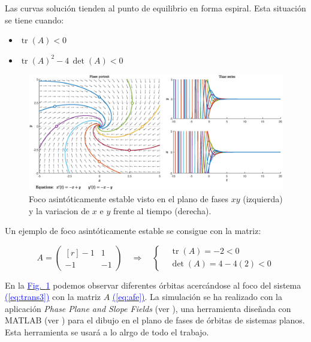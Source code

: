 \documentclass[12pt,a4paper]{report} %
\newcommand{\fref}[1]{\hyperref[#1]{\textcolor{blue}{Fig.~\ref*{#1}}}}
\newcommand{\eref}[1]{\hyperref[#1]{\textcolor{blue}{(\ref*{#1})}}}
\newcommand{\tr}{\operatorname{\textrm{tr}}}
\begin{document}
	\vspace{0.3cm}\noindent Las curvas solución tienden al punto de equilibrio en forma espiral. Esta situación se tiene cuando:
	\begin{itemize}
		\item $\tr(A)<0$
		\item $\tr(A)^2-4\, \det(A)<0$
	\end{itemize}
	
	\begin{figure}[h]
		\centering
		\includegraphics[width=1\textwidth]{estable.eps}
		\caption{Foco asintóticamente estable visto en el plano de fases $xy$ (izquierda) y la variacion de $x$ e $y$ frente al tiempo (derecha).}
		\label{fig:estable}
	\end{figure}\smallskip
	
	\vspace{0.3cm}\noindent Un ejemplo de foco asintóticamente estable se consigue con la matriz:
	
	\begin{equation}
		\label{eq:afe}
		A=\begin{pmatrix*}[r]
			-1 & 1 \\
			-1 & -1
		\end{pmatrix*} \quad \Longrightarrow \quad 
		\left\{ 
		\begin{aligned}
			&\tr(A)=-2<0 \\[2mm]
			&\det(A)=4-4(2)<0
		\end{aligned}
		 \right.
	\end{equation}\smallskip
	
	\noindent En la \fref{fig:estable} podemos observar diferentes órbitas acercándose al foco del sistema \eref{eq:trans3} con la matriz $A$ \eref{eq:afe}. La simulación se ha realizado con la aplicación \textit{Phase Plane and Slope Fields} (ver \cite{phaseplane}), una herramienta diseñada con MATLAB (ver \cite{clevermoller}) para el dibujo en el plano de fases de órbitas de sistemas planos. Esta herramienta se usará a lo alrgo de todo el trabajo.
	
\end{document}
